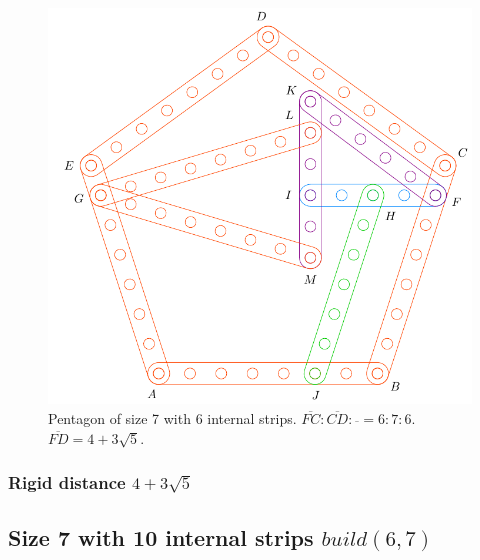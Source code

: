 \documentclass[11pt]{article}
\begin{document}
\begin{figure}[H]
\centering
\includegraphics[scale=0.7]{7/penta7-6a}
\caption{Pentagon of size 7 with 6 internal strips. $\overline{FC} : \overline{CD} : \overline{} = 6:7:6$. $\overline{FD} = 4 + 3\sqrt5$.}
\label{fig:penta7-6a}
\end{figure}

\subsubsection{Rigid distance $4 + 3\sqrt5$}


\subsection{Size 7 with 10 internal strips $build(6,7)$}
\end{document}
